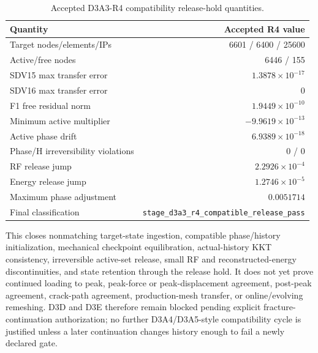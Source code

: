 \begin{table}[ht]
\centering
\caption{Accepted D3A3-R4 compatibility release-hold quantities.}
\begin{tabular}{lr}
\hline
Quantity & Accepted R4 value \\
\hline
Target nodes/elements/IPs & 6601 / 6400 / 25600 \\
Active/free nodes & 6446 / 155 \\
SDV15 max transfer error & $1.3878\times10^{-17}$ \\
SDV16 max transfer error & $0$ \\
F1 free residual norm & $1.9449\times10^{-10}$ \\
Minimum active multiplier & $-9.9619\times10^{-13}$ \\
Active phase drift & $6.9389\times10^{-18}$ \\
Phase/H irreversibility violations & $0$ / $0$ \\
RF release jump & $2.2926\times10^{-4}$ \\
Energy release jump & $1.2746\times10^{-5}$ \\
Maximum phase adjustment & $0.0051714$ \\
Final classification & \texttt{stage\_d3a3\_r4\_compatible\_release\_pass} \\
\hline
\end{tabular}
\end{table}

This closes nonmatching target-state ingestion, compatible phase/history
initialization, mechanical checkpoint equilibration, actual-history KKT
consistency, irreversible active-set release, small RF and reconstructed-energy
discontinuities, and state retention through the release hold. It does not yet
prove continued loading to peak, peak-force or peak-displacement agreement,
post-peak agreement, crack-path agreement, production-mesh transfer, or
online/evolving remeshing. D3D and D3E therefore remain blocked pending
explicit fracture-continuation authorization; no further D3A4/D3A5-style
compatibility cycle is justified unless a later continuation changes history
enough to fail a newly declared gate.

